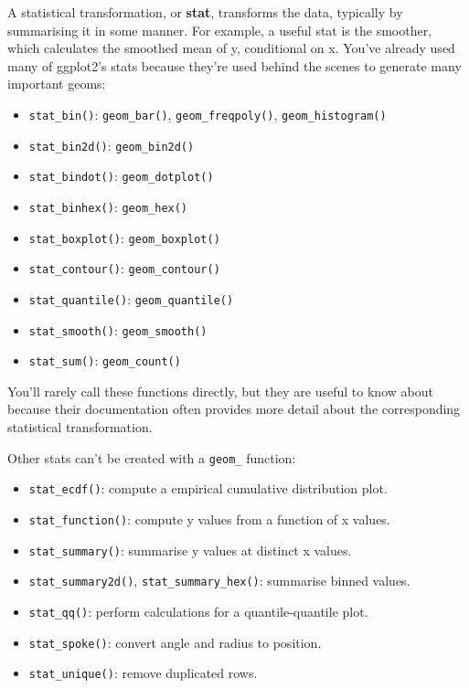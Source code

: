 A statistical transformation, or \textbf{stat}, transforms the data,
typically by summarising it in some manner. For example, a useful stat
is the smoother, which calculates the smoothed mean of y, conditional on
x. You've already used many of ggplot2's stats because they're used
behind the scenes to generate many important geoms:

\begin{itemize}
\tightlist
\item
  \texttt{stat\_bin()}: \texttt{geom\_bar()}, \texttt{geom\_freqpoly()},
  \texttt{geom\_histogram()}
\item
  \texttt{stat\_bin2d()}: \texttt{geom\_bin2d()}
\item
  \texttt{stat\_bindot()}: \texttt{geom\_dotplot()}
\item
  \texttt{stat\_binhex()}: \texttt{geom\_hex()}
\item
  \texttt{stat\_boxplot()}: \texttt{geom\_boxplot()}
\item
  \texttt{stat\_contour()}: \texttt{geom\_contour()}
\item
  \texttt{stat\_quantile()}: \texttt{geom\_quantile()}
\item
  \texttt{stat\_smooth()}: \texttt{geom\_smooth()}
\item
  \texttt{stat\_sum()}: \texttt{geom\_count()}
\end{itemize}

You'll rarely call these functions directly, but they are useful to know
about because their documentation often provides more detail about the
corresponding statistical transformation.

Other stats can't be created with a \texttt{geom\_} function:

\begin{itemize}
\tightlist
\item
  \texttt{stat\_ecdf()}: compute a empirical cumulative distribution
  plot.
\item
  \texttt{stat\_function()}: compute y values from a function of x
  values.
\item
  \texttt{stat\_summary()}: summarise y values at distinct x values.
\item
  \texttt{stat\_summary2d()}, \texttt{stat\_summary\_hex()}: summarise
  binned values.
\item
  \texttt{stat\_qq()}: perform calculations for a quantile-quantile
  plot.
\item
  \texttt{stat\_spoke()}: convert angle and radius to position.
\item
  \texttt{stat\_unique()}: remove duplicated rows.
\end{itemize}

